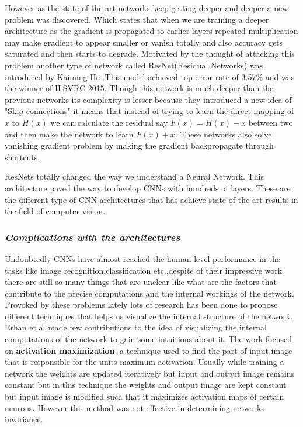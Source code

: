 \noindent However as the state of the art networks keep getting deeper and deeper a new problem was discovered. Which states that when we are training a deeper architecture as the gradient is propagated to earlier layers repeated multiplication may make gradient to appear smaller or vanish totally and also accuracy gets saturated and then starts to degrade. Motivated by the thought of attacking this problem another type of network called ResNet(Residual Networks) was introduced by Kaiming He \cite{ResNet15}.This model achieved top error rate of 3.57\% and was the winner of ILSVRC 2015. Though this network is much deeper than the previous networks its complexity is lesser because they introduced a new idea of "Skip connections" it means that instead of trying to learn the direct mapping of $x$ to $H(x)$ we can calculate the residual say $F(x)=H(x)-x$ between two and then make the network to learn $F(x)+x$\cite{ResNet15}. These networks also solve vanishing gradient problem by making the gradient backpropagate through shortcuts.

ResNets totally changed the way we understand a Neural Network. This architecture paved the way to develop CNNs with hundreds of layers. These are the different type of CNN architectures that has achieve state of the art results in the field of computer vision.
\subsubsection{\textbf{\textit{Complications with the architectures}}}

Undoubtedly CNNs have almost reached the human level performance in the tasks like image recognition,classification etc.,despite of their impressive work there are still so many things that are unclear like what are the factors that contribute to the precise computations and the internal workings of the network.  Provoked by these problems lately lots of research has been done to propose different techniques that helps us visualize the internal structure of the network. Erhan et al\cite{Erhan09} made few contributions to the idea of visualizing the internal computations of the network to gain some intuitions about it. The work focused on \textbf{activation maximization}, a technique used to find the part of input image that is responsible for the units maximum activation. Usually while training a network the weights are updated iteratively but input and output image remains constant but in this technique the weights and output image are kept constant but input image is modified such that it maximizes activation maps of certain neurons. However this method was not effective in determining networks invariance.  


